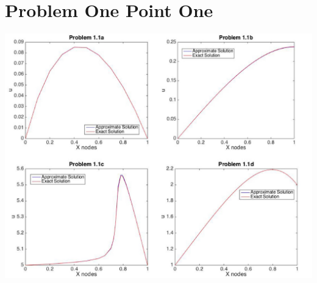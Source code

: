 \documentclass[12pt]{article}
\begin{document}
\section*{Problem One Point One}
\begin{center}
\includegraphics[width=\textwidth, keepaspectratio]{prob1.jpg}
\end{center}
\end{document}
